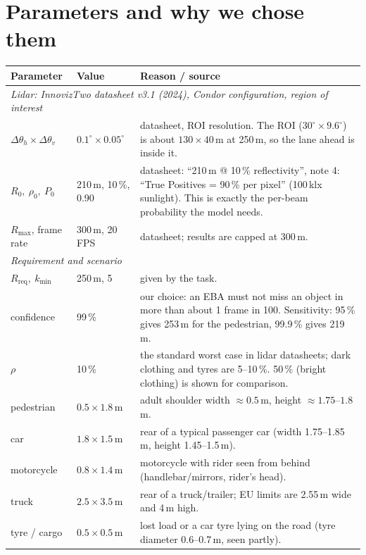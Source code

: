 \documentclass[11pt,a4paper]{article}
\begin{document}
\section{Parameters and why we chose them}

\small
\renewcommand{\arraystretch}{1.25}
\begin{tabularx}{\textwidth}{l l X}
  \toprule
  Parameter & Value & Reason / source \\
  \midrule
  \multicolumn{3}{l}{\textit{Lidar: InnovizTwo datasheet v3.1 (2024), Condor configuration, region of interest}} \\
  $\Delta\theta_h \times \Delta\theta_v$ & $0.1^\circ \times 0.05^\circ$ & datasheet, ROI resolution. The ROI ($30^\circ\times9.6^\circ$)
    is about $130\times40$\,m at 250\,m, so the lane ahead is inside it. \\
  $R_0,\ \rho_0,\ P_0$ & 210\,m, 10\,\%, 0.90 & datasheet: ``210\,m @ 10\,\% reflectivity'', note 4:
    ``True Positives = 90\,\% per pixel'' (100\,klx sunlight). This is exactly the per-beam probability the model needs. \\
  $R_{\max}$, frame rate & 300\,m, 20\,FPS & datasheet; results are capped at 300\,m. \\
  \midrule
  \multicolumn{3}{l}{\textit{Requirement and scenario}} \\
  $R_{\text{req}},\ k_{\min}$ & 250\,m, 5 & given by the task. \\
  confidence & 99\,\% & our choice: an EBA must not miss an object in more than about 1 frame in 100.
    Sensitivity: 95\,\% gives 253\,m for the pedestrian, 99.9\,\% gives 219\,m. \\
  $\rho$ & 10\,\% & the standard worst case in lidar datasheets; dark clothing and tyres are 5--10\,\%.
    50\,\% (bright clothing) is shown for comparison. \\
  pedestrian & $0.5\times1.8$\,m & adult shoulder width $\approx 0.5$\,m, height $\approx 1.75$--$1.8$\,m. \\
  car & $1.8\times1.5$\,m & rear of a typical passenger car (width 1.75--1.85\,m, height 1.45--1.5\,m). \\
  motorcycle & $0.8\times1.4$\,m & motorcycle with rider seen from behind (handlebar/mirrors, rider's head). \\
  truck & $2.5\times3.5$\,m & rear of a truck/trailer; EU limits are 2.55\,m wide and 4\,m high. \\
  tyre / cargo & $0.5\times0.5$\,m & lost load or a car tyre lying on the road (tyre diameter 0.6--0.7\,m, seen partly). \\

\end{tabularx}
\end{document}
